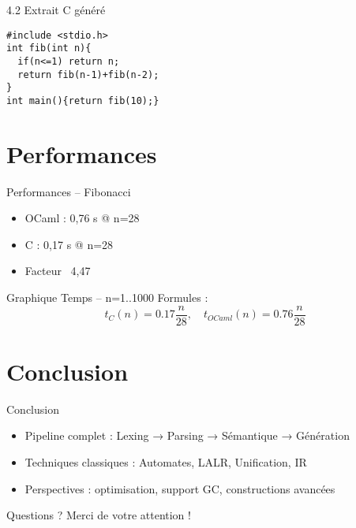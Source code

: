 \documentclass[aspectratio=43]{beamer}
\begin{document}
\begin{frame}[fragile]{4.2 Extrait C généré}
\begin{lstlisting}[style=c]
#include <stdio.h>
int fib(int n){
  if(n<=1) return n;
  return fib(n-1)+fib(n-2);
}
int main(){return fib(10);} 
\end{lstlisting}
\end{frame}

\section{Performances}
\begin{frame}{Performances – Fibonacci}
\begin{itemize}
  \item OCaml : 0,76 s @ n=28
  \item C : 0,17 s @ n=28
  \item Facteur ~4,47
\end{itemize}
\end{frame}

\begin{frame}{Graphique Temps – n=1..1000}
Formules :
$$t_C(n)=0.17\frac{n}{28},\quad t_{OCaml}(n)=0.76\frac{n}{28}$$
\end{frame}

\section{Conclusion}
\begin{frame}{Conclusion}
\begin{itemize}
  \item Pipeline complet : Lexing → Parsing → Sémantique → Génération
  \item Techniques classiques : Automates, LALR, Unification, IR
  \item Perspectives : optimisation, support GC, constructions avancées
\end{itemize}
\end{frame}

\begin{frame}{Questions ?}
  \centering Merci de votre attention !
\end{frame}
\end{document}
